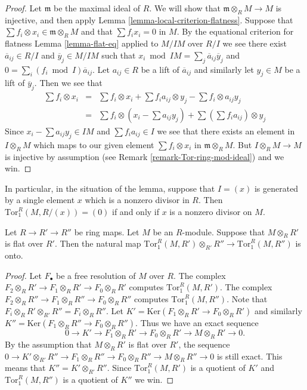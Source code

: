 \begin{proof}
Let $\mathfrak m$ be the maximal ideal of $R$.
We will show that $\mathfrak m \otimes_R M \to M$ is injective,
and then apply Lemma \ref{lemma-local-criterion-flatness}.
Suppose that $\sum f_i \otimes x_i \in \mathfrak m \otimes_R M$
and that $\sum f_i x_i = 0$ in $M$. By the equational criterion
for flatness Lemma \ref{lemma-flat-eq} applied to $M/IM$
over $R/I$ we see there exist $\overline{a}_{ij} \in R/I$
and $\overline{y}_j \in M/IM$ such that
$x_i \bmod IM = \sum_j \overline{a}_{ij} \overline{y}_j $
and $0 = \sum_i (f_i \bmod I) \overline{a}_{ij}$.
Let $a_{ij} \in R$ be a lift of $\overline{a}_{ij}$ and
similarly let $y_j \in M$ be a lift of $\overline{y}_j$.
Then we see that
\begin{eqnarray*}
\sum f_i \otimes x_i
& = &
\sum f_i \otimes x_i +
\sum f_ia_{ij} \otimes y_j -
\sum f_i \otimes a_{ij} y_j
\\
& = &
\sum f_i \otimes (x_i - \sum a_{ij} y_j) +
\sum (\sum f_i a_{ij}) \otimes y_j
\end{eqnarray*}
Since $x_i - \sum a_{ij} y_j \in IM$ and
$\sum f_i a_{ij} \in I$ we see that there exists
an element in $I \otimes_R M$ which maps to our given
element $\sum f_i \otimes x_i$ in $\mathfrak m \otimes_R M$.
But $I \otimes_R M \to M$ is injective by assumption (see
Remark \ref{remark-Tor-ring-mod-ideal}) and we win.
\end{proof}

\noindent
In particular, in the situation of the lemma, suppose that
$I = (x)$ is generated by a single element $x$ which is
a nonzero divisor in $R$. Then $\text{Tor}_1^R(M, R/(x)) = (0)$
if and only if $x$ is a nonzero divisor on $M$.

\begin{lemma}
\label{lemma-surjective-on-tor-one}
Let $R \to R' \to R''$ be ring maps.
Let $M$ be an $R$-module. Suppose that $M \otimes_R R'$
is flat over $R'$. Then the natural map
$\text{Tor}_1^R(M, R') \otimes_{R'} R'' \to
\text{Tor}_1^R(M, R'')$ is onto.
\end{lemma}

\begin{proof}
Let $F_\bullet$ be a free resolution of $M$ over $R$.
The complex $F_2 \otimes_R R' \to F_1\otimes_R R' \to F_0 \otimes_R R'$
computes $\text{Tor}_1^R(M, R')$.
The complex $F_2 \otimes_R R'' \to F_1\otimes_R R'' \to F_0 \otimes_R R''$
computes $\text{Tor}_1^R(M, R'')$. Note that
$F_i \otimes_R R' \otimes_{R'} R'' = F_i \otimes_R R''$. Let
$K' = \text{Ker}(F_1\otimes_R R' \to F_0 \otimes_R R')$ and
similarly $K'' = \text{Ker}(F_1\otimes_R R'' \to F_0 \otimes_R R'')$.
Thus we have an exact sequence
$$
0 \to K' \to F_1\otimes_R R' \to F_0 \otimes_R R' \to M\otimes_R R' \to 0.
$$
By the assumption that $M\otimes_R R'$ is flat over $R'$,
the sequence $0 \to K' \otimes_{R'} R''
\to F_1 \otimes_R R'' \to F_0 \otimes_R R'' \to M\otimes_R R'' \to 0$
is still exact. This means that $K'' = K' \otimes_{R'} R''$.
Since $\text{Tor}_1^R(M, R')$ is a quotient of $K'$ and
$\text{Tor}_1^R(M, R'')$ is a quotient of $K''$ we win.
\end{proof}

